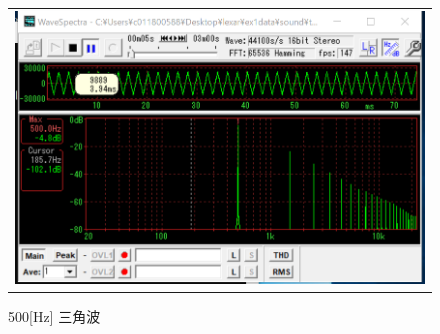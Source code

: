\documentclass[uplatex, titlepage]{jsarticle}
\begin{document}
\begin{figure}[H]
    \begin{tabular}{c}

      \begin{minipage}{0.45\hsize}
        \begin{center}
          \includegraphics[scale=0.45]{./tuusin1.2/triangle500.png}
          \caption{500[Hz] 三角波}
          \label{fig:tri}
        \end{center}
      \end{minipage}

    \end{tabular}
\end{figure}
\end{document}
